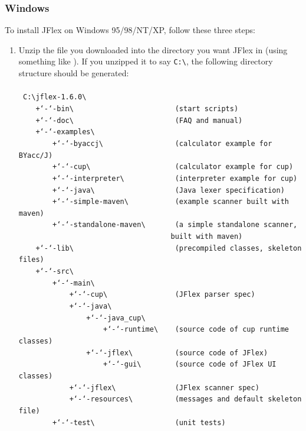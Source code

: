 \documentclass[11pt]{scrartcl}
\newcommand{\bs}{\textbackslash}
\newcommand{\dd}{\char`-\char`-}
\newcommand{\xsmall}{\small}
\newcommand{\longver}{1.6.0}
\begin{document}
\subsubsection{Windows\label{install:windows}}
To install JFlex on Windows 95/98/NT/XP, follow these three steps:
\begin{enumerate}
\item
Unzip the file you downloaded into the directory you want JFlex in (using
something like 
).
If you unzipped it to say \verb+C:\+, the following directory structure
should be generated:
\\
\\
{\xsmall\texttt{
C:\bs jflex-\longver\bs\\ 
\phantom{}~~~~+\dd bin\bs~~~~~~~~~~~~~~~~~~~~~~~~(start scripts)\\
\phantom{}~~~~+\dd doc\bs~~~~~~~~~~~~~~~~~~~~~~~~(FAQ and manual)\\
\phantom{}~~~~+\dd examples\bs\\ 
\phantom{}~~~~~~~~+\dd byaccj\bs~~~~~~~~~~~~~~~~~(calculator example for BYacc/J)\\
\phantom{}~~~~~~~~+\dd cup\bs~~~~~~~~~~~~~~~~~~~~(calculator example for cup)\\
\phantom{}~~~~~~~~+\dd interpreter\bs~~~~~~~~~~~~(interpreter example for cup)\\
\phantom{}~~~~~~~~+\dd java\bs~~~~~~~~~~~~~~~~~~~(Java lexer specification)\\ 
\phantom{}~~~~~~~~+\dd simple-maven\bs~~~~~~~~~~~(example scanner built with maven)\\
\phantom{}~~~~~~~~+\dd standalone-maven\bs~~~~~~~(a simple standalone scanner,\\ 
\phantom{}~~~~~~~~~~~~~~~~~~~~~~~~~~~~~~~~~~~~built with maven)\\
\phantom{}~~~~+\dd lib\bs~~~~~~~~~~~~~~~~~~~~~~~~(precompiled classes, skeleton files)\\ 
\phantom{}~~~~+\dd src\bs\\
\phantom{}~~~~~~~~+\dd main\bs\\ 
\phantom{}~~~~~~~~~~~~+\dd cup\bs~~~~~~~~~~~~~~~~(JFlex parser spec)\\
\phantom{}~~~~~~~~~~~~+\dd java\bs\\ 
\phantom{}~~~~~~~~~~~~~~~~+\dd java\_cup\bs\\ 
\phantom{}~~~~~~~~~~~~~~~~~~~~+\dd runtime\bs~~~~(source code of cup runtime classes)\\ 
\phantom{}~~~~~~~~~~~~~~~~+\dd jflex\bs~~~~~~~~~~(source code of JFlex)\\ 
\phantom{}~~~~~~~~~~~~~~~~~~~~+\dd gui\bs~~~~~~~~(source code of JFlex UI classes)\\
\phantom{}~~~~~~~~~~~~+\dd jflex\bs~~~~~~~~~~~~~~(JFlex scanner spec)\\
\phantom{}~~~~~~~~~~~~+\dd resources\bs~~~~~~~~~~(messages and default skeleton file)\\
\phantom{}~~~~~~~~+\dd test\bs~~~~~~~~~~~~~~~~~~~(unit tests)\\
}
}


\end{enumerate}
\end{document}
